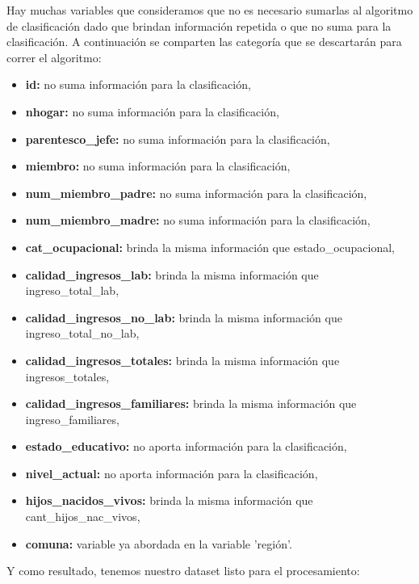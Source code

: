 \documentclass[a4paper]{article}
\begin{document}
        Hay muchas variables que consideramos que no es necesario sumarlas al algoritmo de clasificación dado que brindan información repetida o que no suma para la clasificación. A continuación se comparten las categoría que se descartarán para correr el algoritmo: 
        \begin{itemize}
            \item \textbf{id:} no suma información para la clasificación,
            \item \textbf{nhogar:} no suma información para la clasificación,
            \item \textbf{parentesco\_jefe:} no suma información para la clasificación,
            \item \textbf{miembro:} no suma información para la clasificación,
            \item \textbf{num\_miembro\_padre:} no suma información para la clasificación,
            \item \textbf{num\_miembro\_madre:} no suma información para la clasificación,
            \item \textbf{cat\_ocupacional:} brinda la misma información que estado\_ocupacional,
            \item \textbf{calidad\_ingresos\_lab:} brinda la misma información que ingreso\_total\_lab,
            \item \textbf{calidad\_ingresos\_no\_lab:} brinda la misma información que ingreso\_total\_no\_lab,
            \item \textbf{calidad\_ingresos\_totales:} brinda la misma información que ingresos\_totales,
            \item \textbf{calidad\_ingresos\_familiares:} brinda la misma información que ingreso\_familiares,
            \item \textbf{estado\_educativo:} no aporta información para la clasificación,
            \item \textbf{nivel\_actual:} no aporta información para la clasificación,
            \item \textbf{hijos\_nacidos\_vivos:} brinda la misma información que cant\_hijos\_nac\_vivos,
            \item \textbf{comuna:} variable ya abordada en la variable 'región'.
        \end{itemize}

        Y como resultado, tenemos nuestro dataset listo para el procesamiento:
\end{document}
